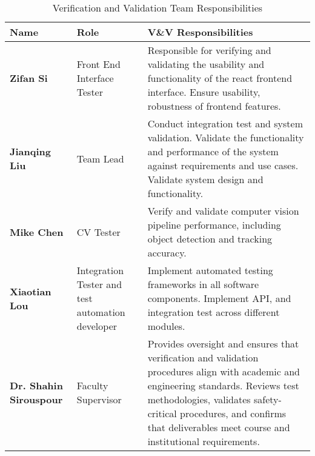 \documentclass[12pt, titlepage]{article}
\begin{document}
\begin{table}[H]
  \centering
  \caption{Verification and Validation Team Responsibilities}
  \label{tab:vnv_team}
  \begin{tabular}{|p{3.5cm}|p{3.5cm}|p{8cm}|}
    \hline
    \textbf{Name}                  & \textbf{Role}                                    & \textbf{V\&V Responsibilities} \\ \hline

    \textbf{Zifan Si}              & Front End Interface Tester                       &
    Responsible for verifying and validating the usability and functionality of the
    react frontend interface.
    Ensure usability, robustness of frontend features.                                                                 \\ \hline

    \textbf{Jianqing Liu}          & Team Lead                                        &
    Conduct integration test and system validation. Validate the functionality and
    performance of the system against requirements and use cases. Validate system
    design and functionality.                                                                                          \\ \hline

    \textbf{Mike Chen}             & CV Tester                                        &
    Verify and validate computer vision pipeline performance, including object detection
    and tracking accuracy.                                                                                             \\ \hline

    \textbf{Xiaotian Lou}          & Integration Tester and test automation developer &
    Implement automated testing frameworks in all software components. Implement
    API, and integration test across different modules.
    \\ \hline

    \textbf{Dr. Shahin Sirouspour} & Faculty Supervisor                               &
    Provides oversight and ensures that verification and validation procedures
    align with academic and engineering standards.
    Reviews test methodologies, validates safety-critical procedures, and
    confirms that deliverables meet course and institutional requirements.
    \\ \hline

  \end{tabular}
\end{table}
\end{document}
